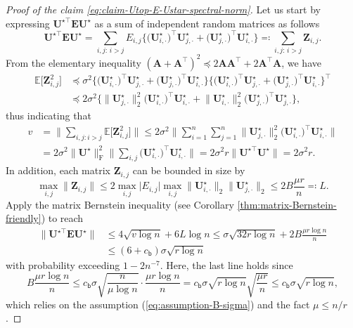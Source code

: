 \begin{proof}[Proof of the claim \eqref{eq:claim-Utop-E-Ustar-spectral-norm}]


Let us start by expressing $\bm{U}^{\star\top}\bm{E}\bm{U}^{\star}$
as a sum of independent random matrices as follows
%
\[
\bm{U}^{\star\top}\bm{E}\bm{U}^{\star}=\sum_{i,j:\,i>j}E_{i,j}\Big\{\big(\bm{U}_{i,\cdot}^{\star}\big)^{\top}\bm{U}_{j,\cdot}^{\star}+\big(\bm{U}_{j,\cdot}^{\star}\big)^{\top}\bm{U}_{i,\cdot}^{\star}\Big\}\eqqcolon\sum_{i,j:\,i>j}\bm{Z}_{i,j}.
\]
%
From the elementary inequality $(\bm{A}+\bm{A}^{\top})^{2}\preceq2\bm{A}\bm{A}^{\top}+2\bm{A}^{\top}\bm{A}$, we have 
%
\begin{align*}
\mathbb{E}\big[\bm{Z}_{i,j}^{2}\big] & \preceq\sigma^{2}\Big\{\big(\bm{U}_{i,\cdot}^{\star}\big)^{\top}\bm{U}_{j,\cdot}^{\star}+\big(\bm{U}_{j,\cdot}^{\star}\big)^{\top}\bm{U}_{i,\cdot}^{\star}\Big\}\Big\{\big(\bm{U}_{i,\cdot}^{\star}\big)^{\top}\bm{U}_{j,\cdot}^{\star}+\big(\bm{U}_{j,\cdot}^{\star}\big)^{\top}\bm{U}_{i,\cdot}^{\star}\Big\}^{\top}\\
 & \preceq2\sigma^{2}\Big\{\big\|\bm{U}_{j,\cdot}^{\star}\big\|_{2}^{2}\big(\bm{U}_{i,\cdot}^{\star}\big)^{\top}\bm{U}_{i,\cdot}^{\star}+\big\|\bm{U}_{i,\cdot}^{\star}\big\|_{2}^{2}\big(\bm{U}_{j,\cdot}^{\star}\big)^{\top}\bm{U}_{j,\cdot}^{\star}\Big\},
\end{align*}
%
thus indicating that
%
\begin{align*}
v & =\Big\|\sum_{i,j:i>j}\mathbb{E}\big[\bm{Z}_{i,j}^{2}\big]\Big\|\leq2\sigma^{2}\Big\|\sum_{i=1}^{n}\sum_{j=1}^{n}\big\|\bm{U}_{j,\cdot}^{\star}\big\|_{2}^{2}\big(\bm{U}_{i,\cdot}^{\star}\big)^{\top}\bm{U}_{i,\cdot}^{\star}\Big\|\\
 & =2\sigma^{2}\|\bm{U}^{\star}\|_{\mathrm{F}}^{2}\Big\|\sum_{i,j}\big(\bm{U}_{i,\cdot}^{\star}\big)^{\top}\bm{U}_{i,\cdot}^{\star}\Big\|=2\sigma^{2}r\Big\|\bm{U}^{\star\top}\bm{U}^{\star}\Big\|=2\sigma^{2}r.
\end{align*}
%
In addition, each matrix $\bm{Z}_{i,j}$ can be bounded in size by
%
\[
\max_{i,j}\|\bm{Z}_{i,j}\|\leq2\max_{i,j}\big|E_{i,j}\big|\max_{i,j}\big\|\bm{U}_{i,\cdot}^{\star}\big\|_{2}\big\|\bm{U}_{j,\cdot}^{\star}\big\|_{2}\leq2B\frac{\mu r}{n}\eqqcolon L.
\]
%
Apply the matrix Bernstein inequality (see Corollary \ref{thm:matrix-Bernstein-friendly}) to reach
%
\begin{align*}
\big\|\bm{U}^{\star\top}\bm{E}\bm{U}^{\star}\big\| & \leq4\sqrt{v\log n}+6L\log n\leq\sigma\sqrt{32r\log n}+2B\frac{\mu r\log n}{n}\\
 & \leq(6+c_{\mathsf{b}})\sigma\sqrt{r\log n}
\end{align*}
%
with probability exceeding $1-2n^{-7}.$ Here, the last line holds since
%
\[
B\frac{\mu r\log n}{n}\leq c_{\mathsf{b}}\sigma\sqrt{\frac{n}{\mu\log n}}\cdot\frac{\mu r\log n}{n}=c_{\mathsf{b}}\sigma\sqrt{r\log n}\sqrt{\frac{\mu r}{n}}\leq c_{\mathsf{b}}\sigma\sqrt{r\log n},
\]
%
which relies on the assumption (\ref{eq:assumption-B-sigma}) and the fact $\mu\leq n/r$. 
%
\end{proof}


